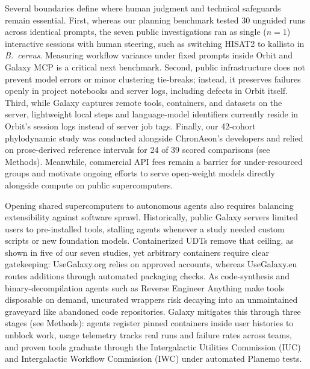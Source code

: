 \documentclass[11pt,letterpaper]{article}
\newcommand{\tool}[1]{\textsf{#1}}
\begin{document}
Several boundaries define where human judgment and technical safeguards remain essential. First, whereas our planning benchmark tested 30 unguided runs across identical prompts, the seven public investigations ran as single ($n = 1$) interactive sessions with human steering, such as switching \tool{HISAT2} to \tool{kallisto} in \textit{B.\ cereus}. Measuring workflow variance under fixed prompts inside \tool{Orbit} and Galaxy MCP is a critical next benchmark. Second, public infrastructure does not prevent model errors or minor clustering tie-breaks; instead, it preserves failures openly in project notebooks and server logs, including defects in \tool{Orbit} itself. Third, while Galaxy captures remote tools, containers, and datasets on the server, lightweight local steps and language-model identifiers currently reside in \tool{Orbit}'s session logs instead of server job tags. Finally, our 42-cohort phylodynamic study was conducted alongside \tool{ChronAeon}'s developers and relied on prose-derived reference intervals for 24 of 39 scored comparisons (see Methods). Meanwhile, commercial API fees remain a barrier for under-resourced groups and motivate ongoing efforts to serve open-weight models directly alongside compute on public supercomputers.

Opening shared supercomputers to autonomous agents also requires balancing extensibility against software sprawl. Historically, public Galaxy servers limited users to pre-installed tools, stalling agents whenever a study needed custom scripts or new foundation models. Containerized UDTs remove that ceiling, as shown in five of our seven studies, yet arbitrary containers require clear gatekeeping: UseGalaxy.org relies on approved accounts, whereas UseGalaxy.eu routes additions through automated packaging checks. As code-synthesis and binary-decompilation agents such as \tool{Reverse Engineer Anything} \cite{rea2026} make tools disposable on demand, uncurated wrappers risk decaying into an unmaintained graveyard like abandoned code repositories. Galaxy mitigates this through three stages (see Methods): agents register pinned containers inside user histories to unblock work, usage telemetry tracks real runs and failure rates across teams, and proven tools graduate through the Intergalactic Utilities Commission (IUC) \cite{iuc2026} and Intergalactic Workflow Commission (IWC) \cite{iwc2026} under automated \tool{Planemo} \cite{bray2023planemo} tests.
\end{document}
